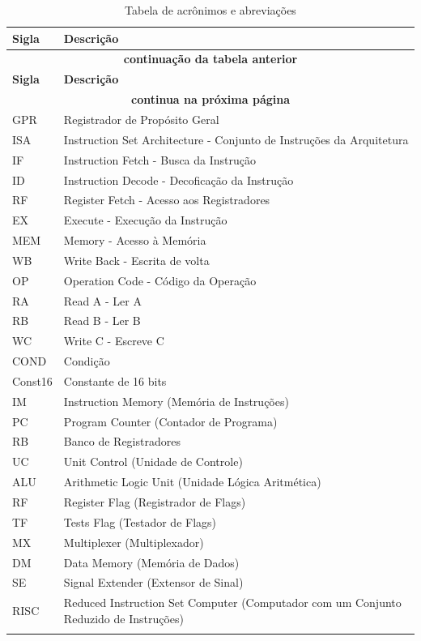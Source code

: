 \documentclass{report}
\begin{document}
\begin{center}
\begin{longtable}[pos]{|m{52pt} | m{350pt}|} \hline
	\cellcolor[gray]{0.9} \textbf{Sigla} & \cellcolor[gray]{0.9}\textbf{Descrição}\\ \hline \endfirsthead \hline
	\multicolumn{2}{|c|}{{\bfseries \textbf{continuação da tabela anterior}}} \\ \hline
	\cellcolor[gray]{0.9} \textbf{Sigla} & \cellcolor[gray]{0.9}\textbf{Descrição}\\ \hline \endhead
	\multicolumn{2}{|c|}{{\textbf{continua na próxima página}}} \\ \hline \endfoot
	\hline \endlastfoot
	
	GPR     & Registrador de Propósito Geral\\ \hline
    ISA     & Instruction Set Architecture - Conjunto de Instruções da Arquitetura\\ \hline
    IF      & Instruction Fetch - Busca da Instrução  \\ \hline
    ID      & Instruction Decode - Decoficação da Instrução \\ \hline
    RF      & Register Fetch -  Acesso aos Registradores\\ \hline
    EX      & Execute - Execução da Instrução\\ \hline
    MEM     & Memory - Acesso à Memória\\ \hline
    WB      & Write Back - Escrita de volta\\ \hline
    OP      & Operation Code - Código da Operação\\ \hline
    RA      & Read A - Ler A\\ \hline
    RB      & Read B - Ler B\\ \hline
    WC      & Write C - Escreve C\\ \hline
    COND    & Condição\\ \hline
    Const16 & Constante de 16 bits \\ \hline
    IM     & Instruction Memory (Memória de Instruções)\\ \hline
	PC     & Program Counter (Contador de Programa)\\ \hline
	RB     & Banco de Registradores\\ \hline
	UC     & Unit Control (Unidade de Controle)\\ \hline
	ALU    & Arithmetic Logic Unit (Unidade Lógica Aritmética)\\ \hline
	RF     & Register Flag (Registrador de Flags)\\ \hline
	TF     & Tests Flag (Testador de Flags)\\ \hline
	MX     & Multiplexer (Multiplexador)\\ \hline
	DM     & Data Memory (Memória de Dados)\\ \hline
	SE     & Signal Extender (Extensor de Sinal)\\ \hline
	RISC   & Reduced Instruction Set Computer (Computador com um Conjunto Reduzido de Instruções)\\ \hline

\caption{Tabela de acrônimos e abreviações}
\end{longtable}
\end{center}
\end{document}
